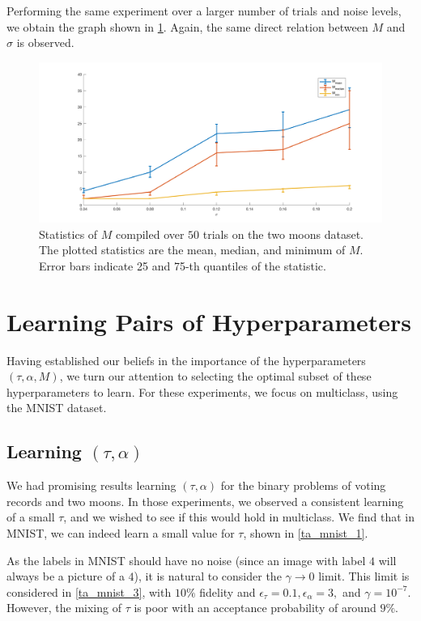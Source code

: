 \documentclass{siamart1116}
\begin{document}
        Performing the same experiment over a larger number of trials and noise levels, we obtain the graph shown in \cref{taM_M_moons_3}. Again, the same direct relation between $M$ and $\sigma$ is observed.

        \begin{figure}[!htb]
        \centering
        \caption{\label{taM_M_moons_3}Statistics of $M$ compiled over $50$ trials on the two moons dataset. The plotted statistics are the mean, median, and minimum of $M$. Error bars indicate 25 and 75-th quantiles of the statistic.}
        \includegraphics[width=0.8\linewidth]{M_observations/all_M_sigma.png}
        \end{figure}

\section{Learning Pairs of Hyperparameters}
    Having established our beliefs in the importance of the hyperparameters $(\tau, \alpha, M)$, we turn our attention to selecting the optimal subset of these hyperparameters to learn. For these experiments, we focus on multiclass, using the MNIST dataset.
    \subsection{Learning $(\tau, \alpha)$}
        We had promising results learning $(\tau, \alpha)$ for the binary problems of voting records and two moons. In those experiments, we observed a consistent learning of a small $\tau$, and we wished to see if this would hold in multiclass. We find that in MNIST, we can indeed learn a small value for $\tau$, shown in \cref{ta_mnist_1}.

        As the labels in MNIST should have no noise (since an image with label $4$ will always be a picture of a $4$), it is natural to consider the $\gamma \to 0$ limit. This limit is considered in \cref{ta_mnist_3}, with $10\%$ fidelity and $\epsilon_\tau = 0.1, \epsilon_\alpha = 3,$ and $\gamma = 10^{-7}$. However, the mixing of $\tau$ is poor with an acceptance probability of around $9\%$.
\end{document}
